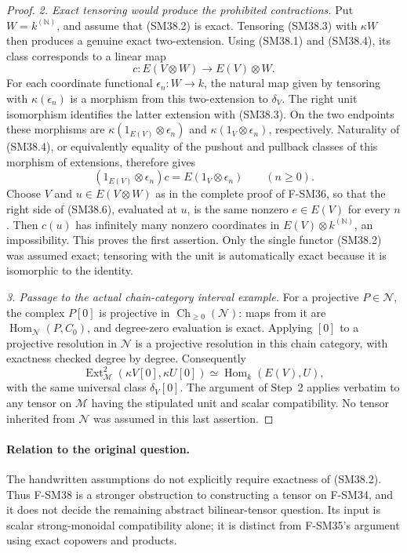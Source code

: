 \begin{proof}
\emph{2. Exact tensoring would produce the prohibited contractions.}
Put \(W=k^{(\mathbb N)}\), and assume that (SM38.2) is
exact.  Tensoring (SM38.3) with \(\kappa W\) then produces
a genuine exact two-extension.  Using (SM38.1) and (SM38.4),
its class corresponds to a linear map
\[
          c:E(V\otimes W)\longrightarrow E(V)\otimes W.
                                                               \tag{SM38.5}
\]
For each coordinate functional \(\epsilon_n:W\to k\),
the natural map given by tensoring with \(\kappa(\epsilon_n)\)
is a morphism from this two-extension to \(\delta_V\).
The right unit isomorphism identifies the latter extension
with (SM38.3).  On the two endpoints these morphisms are
\(\kappa(1_{E(V)}\otimes\epsilon_n)\) and
\(\kappa(1_V\otimes\epsilon_n)\), respectively.
Naturality of (SM38.4), or equivalently equality of the
pushout and pullback classes of this morphism of extensions,
therefore gives
\[
    (1_{E(V)}\otimes\epsilon_n)c
                    =E(1_V\otimes\epsilon_n)\qquad(n\ge0).
                                                               \tag{SM38.6}
\]
Choose \(V\) and \(u\in E(V\otimes W)\) as in the complete
proof of F-SM36, so that the right side of (SM38.6), evaluated
at \(u\), is the same nonzero \(e\in E(V)\) for every
\(n\).  Then \(c(u)\) has infinitely many nonzero
coordinates in \(E(V)\otimes k^{(\mathbb N)}\), an
impossibility.  This proves the first assertion.  Only the
single functor (SM38.2) was assumed exact; tensoring with the
unit is automatically exact because it is isomorphic to the
identity.

\emph{3. Passage to the actual chain-category interval example.}
For a projective \(P\in\mathcal N\), the complex \(P[0]\)
is projective in \(\operatorname{Ch}_{\ge0}(\mathcal N)\):
maps from it are \(\operatorname{Hom}_{\mathcal N}(P,C_0)\),
and degree-zero evaluation is exact.  Applying \([0]\) to a
projective resolution in \(\mathcal N\) is a projective
resolution in this chain category, with exactness checked
degree by degree.  Consequently
\[
 \operatorname{Ext}^2_{\mathcal M}(\kappa V[0],\kappa U[0])
          \simeq\operatorname{Hom}_k(E(V),U),                 \tag{SM38.7}
\]
with the same universal class \(\delta_V[0]\).  The
argument of Step~2 applies verbatim to any tensor on
\(\mathcal M\) having the stipulated unit and scalar
compatibility.  No tensor inherited from \(\mathcal N\)
was assumed in this last assertion.
\end{proof}

\paragraph{Relation to the original question.}
The handwritten assumptions do not explicitly require
exactness of (SM38.2).  Thus F-SM38 is a stronger obstruction
to constructing a tensor on F-SM34, and it does not decide
the remaining abstract bilinear-tensor question.  Its input
is scalar strong-monoidal compatibility alone; it is distinct
from F-SM35's argument using exact copowers and products.
